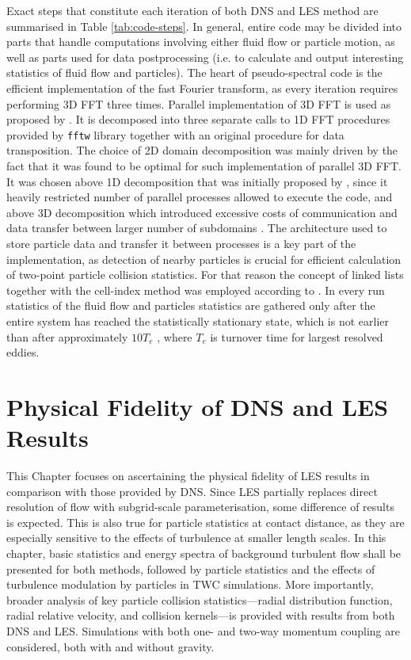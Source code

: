 \documentclass{pracamgren}
\begin{document}
Exact steps that constitute each iteration of both DNS and LES method are summarised in Table \ref{tab:code-steps}.
In general, entire code may be divided into parts that handle computations involving either fluid flow or particle motion, as well as parts used for data postprocessing (i.e. to calculate and output interesting statistics of fluid flow and particles).
The heart of pseudo-spectral code is the efficient implementation of the fast Fourier transform, as every iteration requires performing 3D FFT three times.
Parallel implementation of 3D FFT is used as proposed by \textcite{Ayala2013}.
It is decomposed into three separate calls to 1D FFT procedures provided by \texttt{fftw} library together with an original procedure for data transposition.
The choice of 2D domain decomposition was mainly driven by the fact that it was found to be optimal for such implementation of parallel 3D FFT.  
It was chosen above 1D decomposition that was initially proposed by \textcite{Dmitruk2001}, since it heavily restricted number of parallel processes allowed to execute the code, and above 3D decomposition which introduced excessive costs of communication and data transfer between larger number of subdomains \parencite{Ayala2013}.   
The architecture used to store particle data and transfer it between processes is a key part of the implementation, as detection of nearby particles is crucial for efficient calculation of two-point particle collision statistics.
For that reason the concept of linked lists together with the cell-index method was employed according to \textcite[p. 149--152]{Allen1987}.
In every run statistics of the fluid flow and particles statistics are gathered only after the entire system has reached the statistically stationary state, which is not earlier than after approximately $10 T_e$ \parencite{Rosa2017}, where $T_e$ is turnover time for largest resolved eddies.  



\chapter{Physical Fidelity of DNS and LES Results}
\label{ch:ch2}

This Chapter focuses on ascertaining the physical fidelity of LES results in comparison with those provided by DNS.
Since LES partially replaces direct resolution of flow with subgrid-scale parameterisation, some difference of results is expected.
This is also true for particle statistics at contact distance, as they are especially sensitive to the effects of turbulence at smaller length scales.
In this chapter, basic statistics and energy spectra of background turbulent flow shall be presented for both methods, followed by particle statistics and the effects of turbulence modulation by particles in TWC simulations.
More importantly, broader analysis of key particle collision statistics---radial distribution function, radial relative velocity, and collision kernels---is provided with results from both DNS and LES.
Simulations with both one- and two-way momentum coupling are considered, both with and without gravity.
\end{document}
